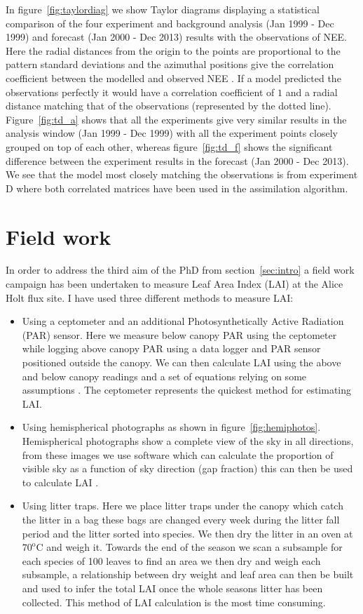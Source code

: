 \documentclass[11pt]{article}
\begin{document}
In figure~\ref{fig:taylordiag} we show Taylor diagrams displaying a statistical comparison of the four experiment and background analysis (Jan 1999 - Dec 1999) and forecast (Jan 2000 - Dec 2013) results with the observations of NEE. Here the radial distances from the origin to the points are proportional to the pattern standard deviations and the azimuthal positions give the correlation coefficient between the modelled and observed NEE \citep{Taylor2001}. If a model predicted the observations perfectly it would have a correlation coefficient of $1$ and a radial distance matching that of the observations (represented by the dotted line). Figure~\ref{fig:td_a} shows that all the experiments give very similar results in the analysis window (Jan 1999 - Dec 1999) with all the experiment points closely grouped on top of each other, whereas figure~\ref{fig:td_f} shows the significant difference between the experiment results in the forecast (Jan 2000 - Dec 2013). We see that the model most closely matching the observations is from experiment D where both correlated matrices have been used in the assimilation algorithm.


\section{Field work} \label{sec:fieldwork}

In order to address the third aim of the PhD from section~\ref{sec:intro} a field work campaign has been undertaken to measure Leaf Area Index (LAI) at the Alice Holt flux site. I have used three different methods to measure LAI:
\begin{itemize}
\item Using a ceptometer and an additional Photosynthetically Active Radiation (PAR) sensor. Here we measure below canopy PAR using the ceptometer while logging above canopy PAR using a data logger and PAR sensor positioned outside the canopy. We can then calculate LAI using the above and below canopy readings and a set of equations relying on some assumptions \citep{fassnacht1994comparison}. The ceptometer represents the quickest method for estimating LAI.
\item Using hemispherical photographs as shown in figure~\ref{fig:hemiphotos}. Hemispherical photographs show a complete view of the sky in all directions, from these images we use software which can calculate the proportion of visible sky as a function of sky direction (gap fraction) this can then be used to calculate LAI  \citep{Jonckheere2004}.
\item Using litter traps. Here we place litter traps under the canopy which catch the litter in a bag these bags are changed every week during the litter fall period and the litter sorted into species. We then dry the litter in an oven at $70^{\text{o}}\text{C}$ and weigh it. Towards the end of the season we scan a subsample for each species of 100 leaves  to find an area we then dry and weigh each subsample, a relationship between dry weight and leaf area can then be built and used to infer the total LAI once the whole seasons litter has been collected. This method of LAI calculation is the most time consuming.  
\end{itemize}
\end{document}
